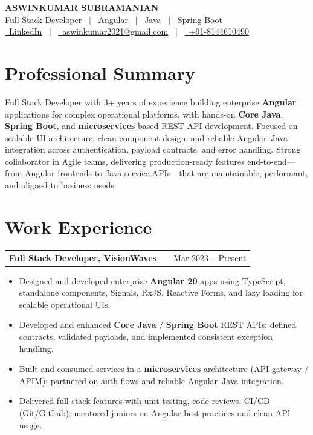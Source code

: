 \documentclass[a4paper,10pt]{article}
\makeatletter
\newenvironment{joblong}[2]
    {
    \begin{tabularx}{\linewidth}{@{}l X r@{}}
    \textbf{#1} & \hfill &  #2 \\[0pt]
    \end{tabularx}
    \begin{minipage}[t]{\linewidth}
    \begin{itemize}[nosep, leftmargin=1em, itemsep=1pt,label=--]
    }
    {
    \end{itemize}
    \end{minipage}
    }
\makeatother
\begin{document}
\begin{center}
    {\LARGE\textbf{ASWINKUMAR SUBRAMANIAN}} \\[2pt]
    {\large Full Stack Developer \ $|$ \ Angular \ $|$ \ Java \ $|$ \ Spring Boot} \\[3pt]
\normalsize
\href{https://www.linkedin.com/in/aswin-kumar-b75907212/}{\faLinkedin\ LinkedIn} \ $|$ \
\href{mailto:aswinkumar2021@gmail.com}{\faEnvelope\ aswinkumar2021@gmail.com} \ $|$ \
\href{tel:+918144610490}{\faMobile\ +91-8144610490}
\end{center}

\section{\textbf{Professional Summary}}

Full Stack Developer with 3+ years of experience building enterprise \textbf{Angular} applications for complex operational platforms, with hands-on \textbf{Core Java}, \textbf{Spring Boot}, and \textbf{microservices}-based REST API development. Focused on scalable UI architecture, clean component design, and reliable Angular--Java integration across authentication, payload contracts, and error handling. Strong collaborator in Agile teams, delivering production-ready features end-to-end---from Angular frontends to Java service APIs---that are maintainable, performant, and aligned to business needs.


\section{\textbf{Work Experience}}

\begin{joblong}{Full Stack Developer, VisionWaves}{Mar 2023 -- Present}
\item Designed and developed enterprise \textbf{Angular 20} apps using TypeScript, standalone components, Signals, RxJS, Reactive Forms, and lazy loading for scalable operational UIs.
\item Developed and enhanced \textbf{Core Java} / \textbf{Spring Boot} REST APIs; defined contracts, validated payloads, and implemented consistent exception handling.
\item Built and consumed services in a \textbf{microservices} architecture (API gateway / APIM); partnered on auth flows and reliable Angular--Java integration.
\item Delivered full-stack features with unit testing, code reviews, CI/CD (Git/GitLab); mentored juniors on Angular best practices and clean API usage.
\end{joblong}
\end{document}
